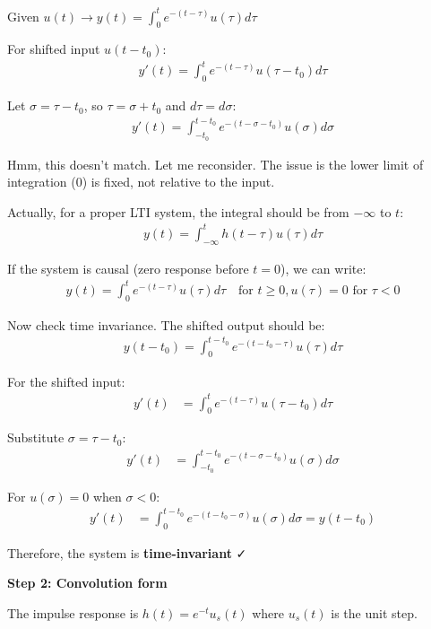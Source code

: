 \documentclass[11pt,a4paper]{article}
\begin{document}
Given $u(t) \to y(t) = \int_0^t e^{-(t-\tau)} u(\tau) d\tau$

For shifted input $u(t - t_0)$:
\begin{align}
y'(t) = \int_0^t e^{-(t-\tau)} u(\tau - t_0) d\tau
\end{align}

Let $\sigma = \tau - t_0$, so $\tau = \sigma + t_0$ and $d\tau = d\sigma$:
\begin{align}
y'(t) = \int_{-t_0}^{t-t_0} e^{-(t-\sigma-t_0)} u(\sigma) d\sigma
\end{align}

Hmm, this doesn't match. Let me reconsider. The issue is the lower limit of integration (0) is fixed, not relative to the input.

Actually, for a proper LTI system, the integral should be from $-\infty$ to $t$:
\begin{align}
y(t) = \int_{-\infty}^t h(t-\tau) u(\tau) d\tau
\end{align}

If the system is causal (zero response before $t=0$), we can write:
\begin{align}
y(t) = \int_0^t e^{-(t-\tau)} u(\tau) d\tau \quad \text{for } t \geq 0, u(\tau) = 0 \text{ for } \tau < 0
\end{align}

Now check time invariance. The shifted output should be:
\begin{align}
y(t - t_0) = \int_0^{t-t_0} e^{-(t-t_0-\tau)} u(\tau) d\tau
\end{align}

For the shifted input:
\begin{align}
y'(t) &= \int_0^t e^{-(t-\tau)} u(\tau - t_0) d\tau
\end{align}

Substitute $\sigma = \tau - t_0$:
\begin{align}
y'(t) &= \int_{-t_0}^{t-t_0} e^{-(t-\sigma-t_0)} u(\sigma) d\sigma
\end{align}

For $u(\sigma) = 0$ when $\sigma < 0$:
\begin{align}
y'(t) &= \int_0^{t-t_0} e^{-(t-t_0-\sigma)} u(\sigma) d\sigma = y(t-t_0)
\end{align}

Therefore, the system is \textbf{time-invariant} ✓

\textbf{Step 2: Convolution form}

The impulse response is $h(t) = e^{-t}u_s(t)$ where $u_s(t)$ is the unit step.
\end{document}
